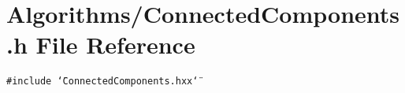 \section{Algorithms/Connected\-Components.h File Reference}
\label{ConnectedComponents_8h}
{\tt \#include \char`\"{}Connected\-Components.hxx\char`\"{}}\par
